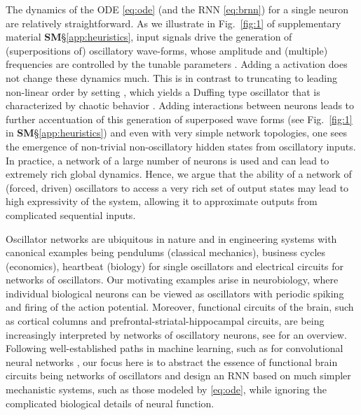 \documentclass{article} \usepackage{iclr2021_conference,times}
\newcommand{\fref}[1] {Fig.~\ref{#1}}
\begin{document}
The dynamics of the ODE \eqref{eq:ode} (and the RNN \eqref{eq:brnn}) for a single neuron are relatively straightforward. As we illustrate in \fref{fig:1} of supplementary material {\bf SM}\S\ref{app:heuristics}, input signals drive the generation of (superpositions of) oscillatory wave-forms, whose amplitude and (multiple) frequencies are controlled by the tunable parameters . Adding a  activation does not change these dynamics much. This is in contrast to truncating  to leading non-linear order by setting , which yields a Duffing type oscillator that is characterized by chaotic behavior \citep{GHbook}. Adding interactions between neurons leads to further accentuation of this generation of superposed wave forms (see \fref{fig:1} in {\bf SM}\S\ref{app:heuristics}) and even with very simple network topologies, one sees the emergence of non-trivial non-oscillatory hidden states from oscillatory inputs. In practice, a network of a large number of neurons is used and can lead to extremely rich global dynamics. Hence, we argue that the ability of a network of (forced, driven) oscillators to access a very rich set of output states may lead to high expressivity of the system, allowing it to approximate outputs from complicated sequential inputs. 

Oscillator networks are ubiquitous in nature and in engineering systems \citep{GHbook,stgz2} with canonical examples being pendulums (classical mechanics), business cycles (economics), heartbeat (biology) for single oscillators and electrical circuits for networks of oscillators. Our motivating examples arise in neurobiology, where individual biological neurons can be viewed as oscillators with periodic spiking and firing of the action potential. Moreover, functional circuits of the brain, such as cortical columns and prefrontal-striatal-hippocampal circuits, are being increasingly interpreted by networks of oscillatory neurons, see \cite{ermen1} for an overview. Following well-established paths in machine learning, such as for convolutional neural networks \citep{DLnat}, our focus here is to abstract the essence of functional brain circuits being networks of oscillators and design an RNN based on much simpler mechanistic systems, such as those modeled by \eqref{eq:ode}, while ignoring the complicated biological details of neural function.
\end{document}
